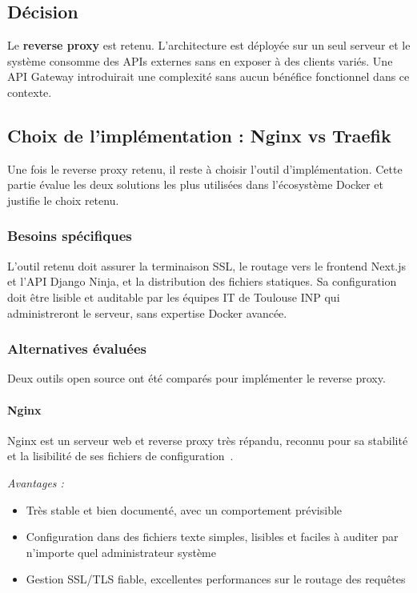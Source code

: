 \subsection{Décision}

Le \textbf{reverse proxy} est retenu. L'architecture est déployée sur
un seul serveur et le système consomme des APIs externes sans en
exposer à des clients variés. Une API Gateway introduirait une
complexité sans aucun bénéfice fonctionnel dans ce contexte.

\subsection{Choix de l'implémentation : Nginx vs Traefik}

Une fois le reverse proxy retenu, il reste à choisir l'outil
d'implémentation. Cette partie évalue les deux solutions
les plus utilisées dans l'écosystème Docker et justifie le choix retenu.

\subsubsection{Besoins spécifiques}

L'outil retenu doit assurer la terminaison SSL, le routage vers
le frontend Next.js et l'API Django Ninja, et la distribution des
fichiers statiques. Sa configuration doit être lisible et auditable
par les équipes IT de Toulouse INP qui administreront le serveur,
sans expertise Docker avancée.

\subsubsection{Alternatives évaluées}

Deux outils open source ont été comparés pour implémenter le reverse proxy.

\paragraph{Nginx}

Nginx est un serveur web et reverse proxy très répandu, reconnu pour
sa stabilité et la lisibilité de ses fichiers de
configuration~\cite{nginx_dev}.

\textit{Avantages :}
\begin{itemize}
  \item Très stable et bien documenté, avec un comportement prévisible
  \item Configuration dans des fichiers texte simples, lisibles
        et faciles à auditer par n'importe quel administrateur système
  \item Gestion SSL/TLS fiable, excellentes performances sur
        le routage des requêtes
\end{itemize}

